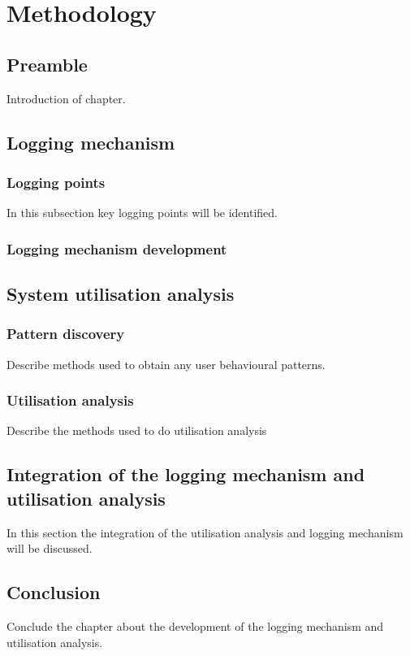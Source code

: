 \chapter{Methodology}
\label{chap:2}

\section{Preamble}
Introduction of chapter.

\section{Logging mechanism}

\subsection{Logging points}
In this subsection key logging points will be identified.

\subsection{Logging mechanism development}

\section{System utilisation analysis}

\subsection{Pattern discovery}
Describe methods used to obtain any user behavioural patterns.

\subsection{Utilisation analysis}
Describe the methods used to do utilisation analysis

\section{Integration of the logging mechanism and utilisation analysis}
In this section the integration of the utilisation analysis and logging mechanism will be discussed.

\section{Conclusion}
Conclude the chapter about the development of the logging mechanism and utilisation analysis.